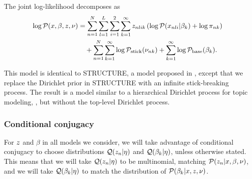 \begin{ex}
The joint log-likelihood decomposes as
\begin{align*}
\log \mathcal{P}(x, \beta, z, \nu) &=
\sum_{n=1}^N \sum_{l=1}^L \sum_{i = 1}^2 \sum_{k=1}^{\infty}
        z_{nlik} \left(
            \log \mathcal{P}(x_{nli} \vert \beta_{k}) + \log \pi_{nk}
        \right)
\nonumber\\&
    \quad +
    \sum_{n=1}^N \sum_{k=1}^{\infty} \log \mathcal{P}_{\mathrm{stick}}(\nu_{nk})
    + \sum_{k=1}^{\infty} \log \mathcal{P}_{\mathrm{base}}(\beta_{k}).
\end{align*}

This model is identical to STRUCTURE,
a model proposed in \citet{pritchard:2000:structure, raj:2014:faststructure},
except that we replace the Dirichlet prior in STRUCTURE
with an infinite stick-breaking process.
The result is a model similar to a hierarchical Dirichlet process for topic modeling,
\citep{teh:2006:hdp},
but without the top-level Dirichlet process.
%
\end{ex}









\subsubsection{Conditional conjugacy}

For $z$ and $\beta$ in all models we consider, we will
take advantage of conditional conjugacy to choose distributions
$\mathcal{Q}(z_n\vert\eta)$ and $\mathcal{Q}(\beta_k\vert\eta)$, unless otherwise stated.
This means that we will take $\mathcal{Q}(z_{n}
\vert \eta)$ to be multinomial, matching $\mathcal{P}(z_{n}
\vert x, \beta, \nu)$, and we will take $\mathcal{Q}(\beta_k \vert \eta)$
to match the distribution of $\mathcal{P}(\beta_{k} \vert x, z, \nu)$.



